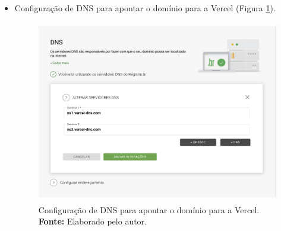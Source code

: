 \begin{itemize}
    \item Configuração de DNS para apontar o domínio para a Vercel (Figura \ref{fig:dns}).
\begin{figure}[H]
    \centering
    \includegraphics[height=8cm, keepaspectratio]{img/Deploy/configuração de dns registrobr.png}
    \caption{ Configuração de DNS para apontar o domínio para a Vercel. \\
        \textbf{Fonte:} Elaborado pelo autor.}
    \label{fig:dns}
\end{figure}

\end{itemize}



